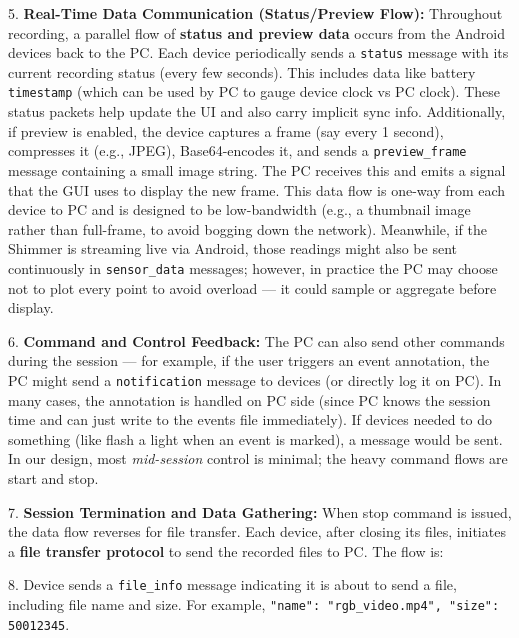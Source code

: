 5.  \textbf{Real-Time Data Communication (Status/Preview Flow):} Throughout
    recording, a parallel flow of \textbf{status and preview data} occurs
    from the Android devices back to the PC. Each device periodically
    sends a \texttt{status} message with its current recording status (every
    few
    seconds)\cite{DeviceServer}\cite{DeviceServer}.
    This includes data like battery %
    \texttt{timestamp} (which can be used by PC to gauge device clock vs PC
    clock). These status packets help update the UI and also carry
    implicit sync info. Additionally, if preview is enabled, the device
    captures a frame (say every 1 second), compresses it (e.g., JPEG),
    Base64-encodes it, and sends a \texttt{preview\_frame} message containing a
    small image
    string\cite{DriverStressThermal2020}.
    The PC receives this and emits a signal that the GUI uses to display
    the new frame. This data flow is one-way from each device to PC and
    is designed to be low-bandwidth (e.g., a thumbnail image rather than
    full-frame, to avoid bogging down the network). Meanwhile, if the
    Shimmer is streaming live via Android, those readings might also be
    sent continuously in \texttt{sensor\_data}
    messages\cite{DeviceServer};
    however, in practice the PC may choose not to plot every point to
    avoid overload --- it could sample or aggregate before display.

6.  \textbf{Command and Control Feedback:} The PC can also send other
    commands during the session --- for example, if the user triggers an
    event annotation, the PC might send a \texttt{notification} message to
    devices (or directly log it on PC). In many cases, the annotation is
    handled on PC side (since PC knows the session time and can just
    write to the events file immediately). If devices needed to do
    something (like flash a light when an event is marked), a message
    would be sent. In our design, most \textit{mid-session} control is minimal;
    the heavy command flows are start and stop.

7.  \textbf{Session Termination and Data Gathering:} When stop command is
    issued, the data flow reverses for file transfer. Each device, after
    closing its files, initiates a \textbf{file transfer protocol} to send
    the recorded files to PC. The flow is:

8.  Device sends a \texttt{file\_info} message indicating it is about to send a
    file, including file name and
    size\cite{DeviceServer}\cite{DeviceServer}.
    For example, \texttt{"name": "rgb_video.mp4", "size": 50012345}.

